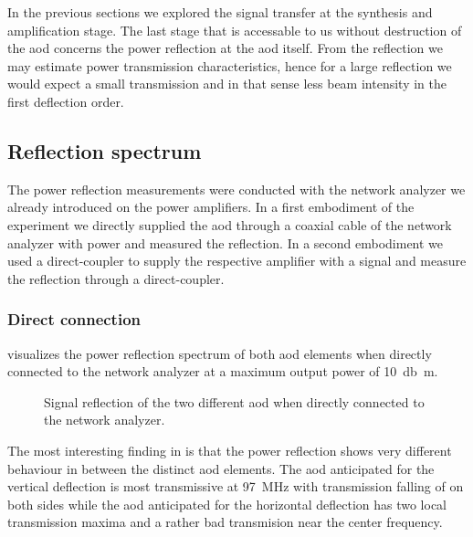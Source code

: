 In the previous sections we explored the signal transfer at the synthesis
and amplification stage. The last stage that is accessable to us without
destruction of the \gls{aod} concerns the power reflection at the \gls{aod}
itself. From the reflection we may estimate power transmission
characteristics, hence for a large reflection we would expect a small
transmission and in that sense less beam intensity in the first deflection
order.

\subsection{Reflection spectrum}

The power reflection measurements were conducted with the network analyzer
we already introduced on the power amplifiers. In a first embodiment of the
experiment we directly supplied the \gls{aod} through a coaxial cable of the
network analyzer with power and measured the reflection. In a second
embodiment we used a direct-coupler to supply the respective amplifier with a
signal and measure the reflection through a direct-coupler.

\subsubsection{Direct connection}

 visualizes the power reflection spectrum
of both \gls{aod} elements when directly connected to the network analyzer at
a maximum output power of \SI{10}{\decibel\meter}.
\begin{figure}[htb]
  \centering
  \begin{adjustbox}{width=\textwidth}
    
  \end{adjustbox}
  \caption{Signal reflection of the two different \gls{aod} when directly
    connected to the network analyzer.
  }\label{fig:signal_reflection_direct}
\end{figure}
The most interesting finding in  is that
the power reflection shows very different behaviour in between the distinct
\gls{aod} elements. The \gls{aod} anticipated for the vertical deflection
is most transmissive at \SI{97}{\mega\hertz} with transmission falling of
on both sides while the \gls{aod} anticipated for the horizontal deflection
has two local transmission maxima and a rather bad transmision near the center
frequency.


